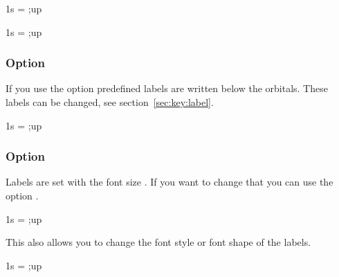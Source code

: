 \documentclass[load-preamble+]{cnltx-doc}
\begin{document}
\begin{example}
  \begin{modiagram}
     { 1s = {;up} }
  \end{modiagram}
  \begin{modiagram}[names-style-add={fill=blue!20}]
     { 1s = {;up} }
  \end{modiagram}
\end{example}

\subsubsection{Option }\label{option:labels}
If you use the option  predefined labels are written below the
orbitals.  These labels can be changed, see section~\ref{sec:key:label}.
\begin{example}
  \begin{modiagram}[labels]
     { 1s = {;up} }
  \end{modiagram}
\end{example}

\subsubsection{Option }\label{option:labels-fs}
Labels are set with the font size .  If you want to change that you
can use the option .
\begin{example}
  \begin{modiagram}[labels,labels-fs=\footnotesize]
     { 1s = {;up} }
  \end{modiagram}
\end{example}

This also allows you to change the font style or font shape of the labels.
\begin{example}
  \begin{modiagram}[labels,labels-fs=\sffamily\footnotesize]
     { 1s = {;up} }
  \end{modiagram}
\end{example}
\end{document}
